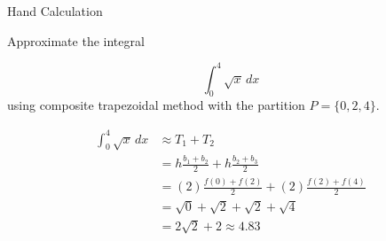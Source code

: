 \documentclass[10pt]{beamer}
\begin{document}
\begin{frame}{Hand Calculation}


\begin{example}
Approximate the integral

$$
\int_{0}^{4} \sqrt{x}\,dx
$$
using composite trapezoidal method with the partition $P=\{0,2,4\}$.
\end{example}
\begin{align*}
    \int_{0}^{4} \sqrt{x}\,dx &\approx T_1 + T_2\\ 
                               &= h\frac{b_1+b_2}{2} + h\frac{b_2+b_3}{2}\\
                               &= (2)\frac{f(0)+f(2)}{2} + (2)\frac{f(2)+f(4)}{2}\\
                               &= \sqrt0+\sqrt2 + \sqrt2+\sqrt4\\
                               &= 2\sqrt2 +2\approx 4.83\\
\end{align*}



\end{frame}

\end{document}
